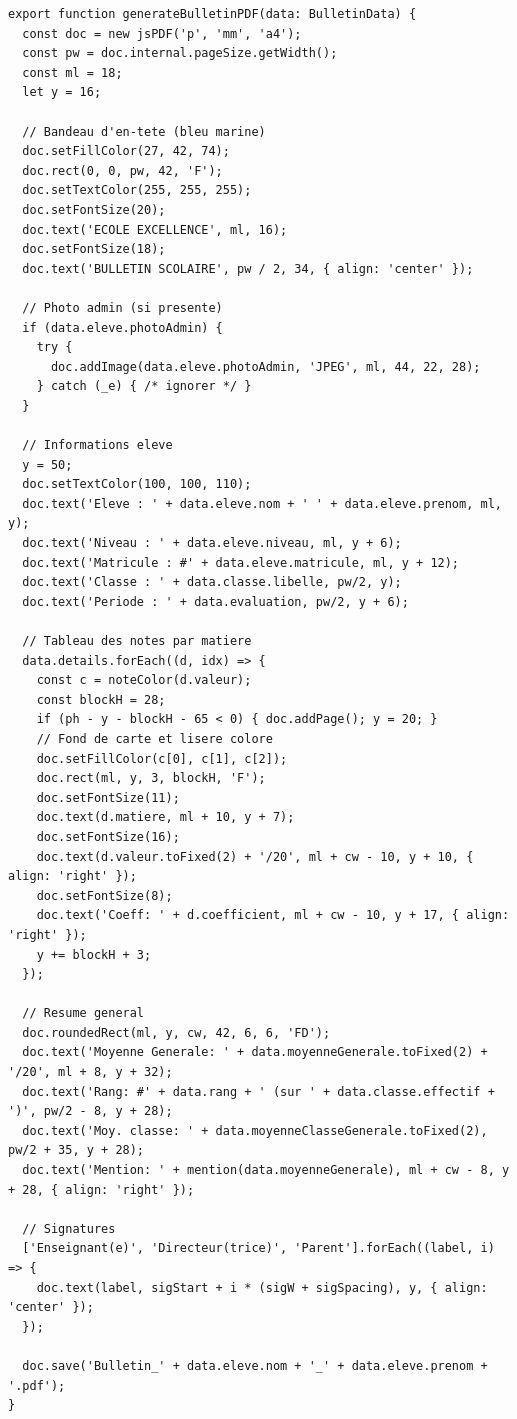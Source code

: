 \documentclass[12pt,a4paper]{article}
\begin{document}
\begin{lstlisting}[style=code]
export function generateBulletinPDF(data: BulletinData) {
  const doc = new jsPDF('p', 'mm', 'a4');
  const pw = doc.internal.pageSize.getWidth();
  const ml = 18;
  let y = 16;

  // Bandeau d'en-tete (bleu marine)
  doc.setFillColor(27, 42, 74);
  doc.rect(0, 0, pw, 42, 'F');
  doc.setTextColor(255, 255, 255);
  doc.setFontSize(20);
  doc.text('ECOLE EXCELLENCE', ml, 16);
  doc.setFontSize(18);
  doc.text('BULLETIN SCOLAIRE', pw / 2, 34, { align: 'center' });

  // Photo admin (si presente)
  if (data.eleve.photoAdmin) {
    try {
      doc.addImage(data.eleve.photoAdmin, 'JPEG', ml, 44, 22, 28);
    } catch (_e) { /* ignorer */ }
  }

  // Informations eleve
  y = 50;
  doc.setTextColor(100, 100, 110);
  doc.text('Eleve : ' + data.eleve.nom + ' ' + data.eleve.prenom, ml, y);
  doc.text('Niveau : ' + data.eleve.niveau, ml, y + 6);
  doc.text('Matricule : #' + data.eleve.matricule, ml, y + 12);
  doc.text('Classe : ' + data.classe.libelle, pw/2, y);
  doc.text('Periode : ' + data.evaluation, pw/2, y + 6);

  // Tableau des notes par matiere
  data.details.forEach((d, idx) => {
    const c = noteColor(d.valeur);
    const blockH = 28;
    if (ph - y - blockH - 65 < 0) { doc.addPage(); y = 20; }
    // Fond de carte et lisere colore
    doc.setFillColor(c[0], c[1], c[2]);
    doc.rect(ml, y, 3, blockH, 'F');
    doc.setFontSize(11);
    doc.text(d.matiere, ml + 10, y + 7);
    doc.setFontSize(16);
    doc.text(d.valeur.toFixed(2) + '/20', ml + cw - 10, y + 10, { align: 'right' });
    doc.setFontSize(8);
    doc.text('Coeff: ' + d.coefficient, ml + cw - 10, y + 17, { align: 'right' });
    y += blockH + 3;
  });

  // Resume general
  doc.roundedRect(ml, y, cw, 42, 6, 6, 'FD');
  doc.text('Moyenne Generale: ' + data.moyenneGenerale.toFixed(2) + '/20', ml + 8, y + 32);
  doc.text('Rang: #' + data.rang + ' (sur ' + data.classe.effectif + ')', pw/2 - 8, y + 28);
  doc.text('Moy. classe: ' + data.moyenneClasseGenerale.toFixed(2), pw/2 + 35, y + 28);
  doc.text('Mention: ' + mention(data.moyenneGenerale), ml + cw - 8, y + 28, { align: 'right' });

  // Signatures
  ['Enseignant(e)', 'Directeur(trice)', 'Parent'].forEach((label, i) => {
    doc.text(label, sigStart + i * (sigW + sigSpacing), y, { align: 'center' });
  });

  doc.save('Bulletin_' + data.eleve.nom + '_' + data.eleve.prenom + '.pdf');
}
\end{lstlisting}
\end{document}
